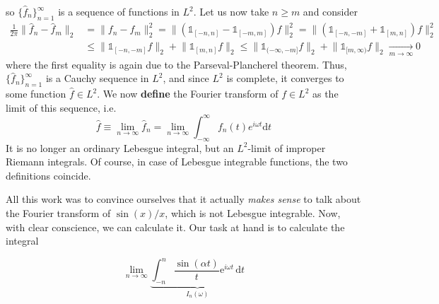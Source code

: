 so \(\{\hat{f}_n\}_{n=1}^{\infty }\) is a sequence of functions in \(L^2\).
Let us now take \(n \geq m\) and consider
\begin{align*}
    \frac{1}{2\pi }\lVert \hat{f} _n - \hat{f} _m \rVert _2 & = \lVert f_n - f_m \rVert_2^2 = \lVert ( \mathbb{1}_{[-n,n]} - \mathbb{1}_{[-m,m]} ) f \rVert_2^2
    = \lVert ( \mathbb{1}_{[-n,-m]} + \mathbb{1}_{[m,n]} ) f \rVert_2^2                                                                                         \\
                                                            & \leq \lVert \mathbb{1}_{[-n,-m]} f \rVert_2 + \lVert \mathbb{1}_{[m,n]} f \rVert_2
    \leq \lVert \mathbb{1}_{(-\infty ,-m]} f \rVert_2 + \lVert \mathbb{1}_{[m,\infty )} f \rVert_2 \xrightarrow[m\to \infty ]{} 0
\end{align*}
where the first equality is again due to the Parseval-Plancherel theorem.
Thus, \(\{\hat{f} _n\}_{n=1}^{\infty}\) is a Cauchy sequence in \(L^2\), and since \(L^2\) is complete, it converges to some
function \(\hat{f} \in L^2\). We now \textbf{define} the Fourier transform of \(f\in L^2\) as the limit of this sequence,
i.e.
\begin{equation}
    \hat{f} \equiv  \lim_{n \to \infty} \hat{f} _n = \lim_{n \to \infty} \int_{-\infty}^{\infty} f_n(t) e^{i \omega t} \mathrm{d}t
\end{equation}
It is no longer an ordinary Lebesgue integral, but an \(L^2\)-limit of improper Riemann integrals. Of course, in case
of Lebesgue integrable functions, the two definitions coincide.

All this work was to convince ourselves that it actually \textit{makes sense} to talk about the Fourier transform of
\(\sin (x)/x\), which is not Lebesgue integrable. Now, with clear conscience, we can calculate it.
Our task at hand is to calculate the integral

\begin{equation}
    \lim_{n \to \infty} \underbrace{\int_{-n}^{n} \frac{\sin (\alpha t)}{t} \mathrm{e}^{i \omega  t} \,\mathrm{d}t}_{I_n(\omega )}
\end{equation}

